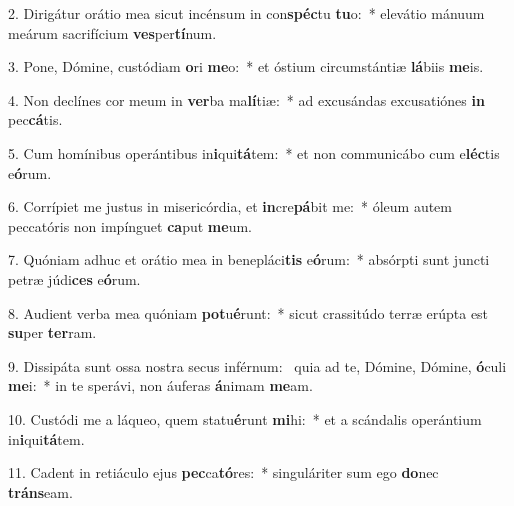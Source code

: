 2. Dirigátur orátio mea sicut incénsum in con\textbf{spéc}tu \textbf{tu}o:~*  elevátio mánuum meárum sacrifícium \textbf{ves}per\textbf{tí}num.\

3. Pone, Dómine, custódiam \textbf{o}ri \textbf{me}o:~*  et óstium circumstántiæ \textbf{lá}biis \textbf{me}is.\

4. Non declínes cor meum in \textbf{ver}ba ma\textbf{lí}tiæ:~*  ad excusándas excusatiónes \textbf{in} pec\textbf{cá}tis.\

5. Cum homínibus operántibus in\textbf{i}qui\textbf{tá}tem:~*  et non communicábo cum e\textbf{léc}tis e\textbf{ó}rum.\

6. Corrípiet me justus in misericórdia, et \textbf{in}cre\textbf{pá}bit me:~*  óleum autem peccatóris non impínguet \textbf{ca}put \textbf{me}um.\

7. Quóniam adhuc et orátio mea in benepláci\textbf{tis} e\textbf{ó}rum:~*  absórpti sunt juncti petræ júdi\textbf{ces} e\textbf{ó}rum.\

8. Audient verba mea quóniam \textbf{pot}u\textbf{é}runt:~*  sicut crassitúdo terræ erúpta est \textbf{su}per \textbf{ter}ram.\

9. Dissipáta sunt ossa nostra secus inférnum: \dag\  quia ad te, Dómine, Dómine, \textbf{ó}culi \textbf{me}i:~*  in te sperávi, non áuferas \textbf{á}nimam \textbf{me}am.\

10. Custódi me a láqueo, quem statu\textbf{é}runt \textbf{mi}hi:~*  et a scándalis operántium in\textbf{i}qui\textbf{tá}tem.\

11. Cadent in retiáculo ejus \textbf{pec}ca\textbf{tó}res:~*  singuláriter sum ego \textbf{do}nec \textbf{tráns}eam.\

